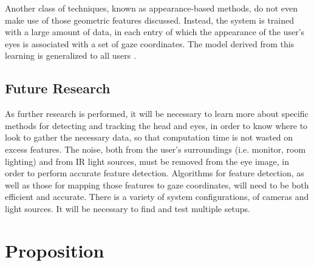 \documentclass[12pt,conference,onecolumn]{IEEEtran}
\begin{document}
Another class of techniques, known as appearance-based methods, do not even make use of those geometric features discussed. Instead, the system is trained with a large amount of data, in each entry of which the appearance of the user's eyes is associated with a set of gaze coordinates. The model derived from this learning is generalized to all users \cite{morimoto}.
\subsection{Future Research}

As further research is performed, it will be necessary to learn more about specific methods for detecting and tracking the head and eyes, in order to know where to look to gather the necessary data, so that computation time is not wasted on excess features. The noise, both from the user's surroundings (i.e. monitor, room lighting) and from IR light sources, must be removed from the eye image, in order to perform accurate feature detection. Algorithms for feature detection, as well as those for mapping those features to gaze coordinates, will need to be both efficient and accurate. There is a variety of system configurations, of cameras and light sources. It will be necessary to find and test multiple setups. 
\section{Proposition} \label{sec:proposition}



\end{document}
